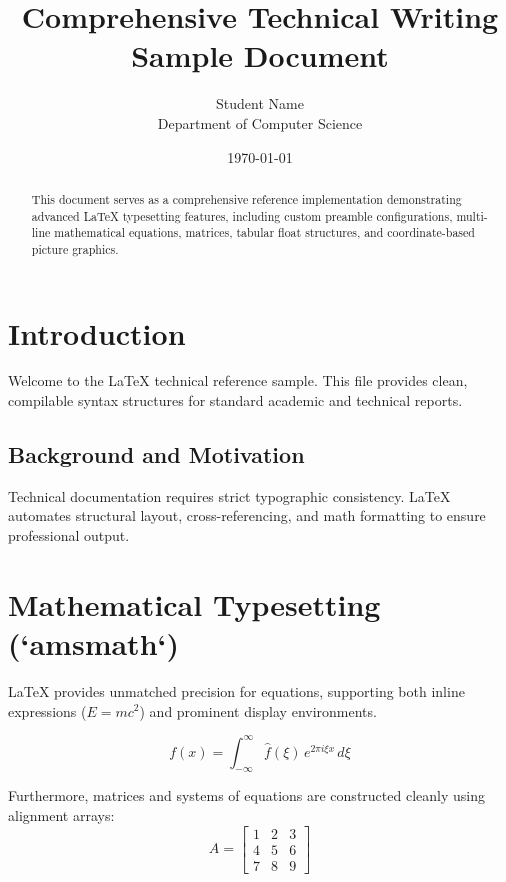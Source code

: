 \documentclass[11pt, a4paper]{article}
\title{Comprehensive Technical Writing Sample Document}
\author{Student Name \\ Department of Computer Science}
\date{\today}
\begin{document}
\maketitle

\begin{abstract}
This document serves as a comprehensive reference implementation demonstrating advanced LaTeX typesetting features, including custom preamble configurations, multi-line mathematical equations, matrices, tabular float structures, and coordinate-based picture graphics.
\end{abstract}

\tableofcontents
\newpage

\section{Introduction}
Welcome to the LaTeX technical reference sample. This file provides clean, compilable syntax structures for standard academic and technical reports.

\subsection{Background and Motivation}
Technical documentation requires strict typographic consistency. LaTeX automates structural layout, cross-referencing, and math formatting to ensure professional output.

\section{Mathematical Typesetting (`amsmath`)}
LaTeX provides unmatched precision for equations, supporting both inline expressions ($E = mc^2$) and prominent display environments.

\begin{equation}
    f(x) = \int_{-\infty}^{\infty} \hat{f}(\xi) \, e^{2\pi i \xi x} \, d\xi
\end{equation}

Furthermore, matrices and systems of equations are constructed cleanly using alignment arrays:
\begin{equation}
    A = \begin{bmatrix} 
        1 & 2 & 3 \\ 
        4 & 5 & 6 \\ 
        7 & 8 & 9 
    \end{bmatrix}
\end{equation}
\end{document}
